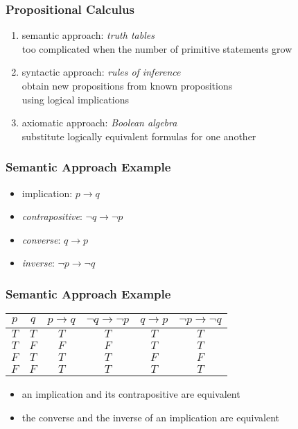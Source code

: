 \documentclass[dvipsnames]{beamer}
\begin{document}
\begin{frame}
  \frametitle{Propositional Calculus}

  \begin{enumerate}
    \item semantic approach: \emph{truth tables}\\
      too complicated when the number of primitive statements grow

    \pause
    \medskip
    \item syntactic approach: \emph{rules of inference}\\
      obtain new propositions from known propositions\\
      using logical implications

    \pause
    \medskip
    \item axiomatic approach: \emph{Boolean algebra}\\
      substitute logically equivalent formulas for one another
  \end{enumerate}
\end{frame}

\begin{frame}
  \frametitle{Semantic Approach Example}

  \begin{itemize}
    \item implication: $p \rightarrow q$

    \medskip
    \item \emph{contrapositive}: $\neg q \rightarrow \neg p$
    \item \emph{converse}: $q \rightarrow p$
    \item \emph{inverse}: $\neg p \rightarrow \neg q$
  \end{itemize}
\end{frame}

\begin{frame}
  \frametitle{Semantic Approach Example}

  \begin{center}
    \begin{tabular}{|c|c||c||c||c||c|}\hline
      $p$ & $q$ & $p \rightarrow q$ & $\neg q \rightarrow \neg p$
          & $q \rightarrow p$ & $\neg p \rightarrow \neg q$\\\hline\hline
      $T$ & $T$ & $T$ & $T$ & $T$ & $T$\\\hline
      $T$ & $F$ & $F$ & $F$ & $T$ & $T$\\\hline
      $F$ & $T$ & $T$ & $T$ & $F$ & $F$\\\hline
      $F$ & $F$ & $T$ & $T$ & $T$ & $T$\\\hline
    \end{tabular}
  \end{center}

  \begin{itemize}
    \item an implication and its contrapositive are equivalent
    \item the converse and the inverse of an implication are equivalent
  \end{itemize}
\end{frame}
\end{document}
